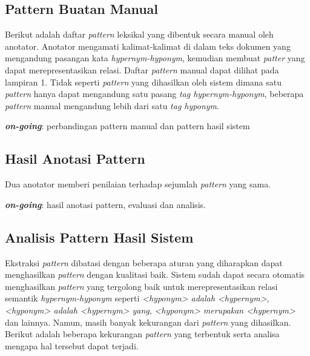 \subsection{Pattern Buatan Manual}
Berikut adalah daftar \textit{pattern} leksikal yang dibentuk secara manual oleh anotator. Anotator mengamati kalimat-kalimat di dalam teks dokumen yang mengandung pasangan kata \textit{hypernym-hyponym}, kemudian membuat \textit{patter} yang dapat merepresentasikan relasi. Daftar \textit{pattern} manual dapat dilihat pada lampiran 1. Tidak seperti \textit{pattern} yang dihasilkan oleh sistem dimana satu \textit{pattern} hanya dapat mengandung satu pasang \textit{tag hypernym-hyponym}, beberapa \textit{pattern} manual mengandung lebih dari satu \textit{tag hyponym}.

\noindent \textbf{\textit{on-going}}: perbandingan pattern manual dan pattern hasil sistem

\subsection{Hasil Anotasi Pattern}
Dua anotator memberi penilaian terhadap sejumlah \textit{pattern} yang sama. 

\noindent \textbf{\textit{on-going}}: hasil anotasi pattern, evaluasi dan analisis.


\subsection{Analisis Pattern Hasil Sistem}
Ekstraksi \textit{pattern} dibatasi dengan beberapa aturan yang diharapkan dapat menghasilkan \textit{pattern} dengan kualitasi baik. Sistem sudah dapat secara otomatis menghasilkan \textit{pattern} yang tergolong baik untuk merepresentasikan relasi semantik \textit{hypernym-hyponym} seperti \textit{<hyponym> adalah <hypernym>}, \textit{<hyponym> adalah <hypernym> yang}, \textit{<hyponym> merupakan <hypernym>} dan lainnya. Namun, masih banyak kekurangan dari \textit{pattern} yang dihasilkan. Berikut adalah beberapa kekurangan \textit{pattern} yang terbentuk serta analisa mengapa hal tersebut dapat terjadi.

